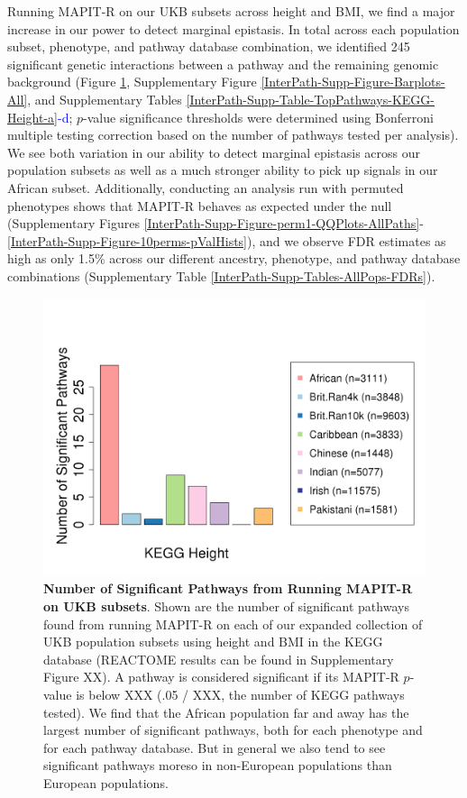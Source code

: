 \documentclass[12pt, a4paper]{article}
\begin{document}
Running MAPIT-R on our UKB subsets across height and BMI, we find a major increase in our power to detect marginal epistasis. In total across each population subset, phenotype, and pathway database combination, we identified 245 significant genetic interactions between a pathway and the remaining genomic background (Figure \ref{InterPath-Main-Figure-Barplots-KEGGHght}, Supplementary Figure \ref{InterPath-Supp-Figure-Barplots-All}, and Supplementary Tables \ref{InterPath-Supp-Table-TopPathways-KEGG-Height-a}\textcolor{blue}{-d}; $p$-value significance thresholds were determined using Bonferroni multiple testing correction based on the number of pathways tested per analysis). We see both variation in our ability to detect marginal epistasis across our population subsets as well as a much stronger ability to pick up signals in our African subset. Additionally, conducting an analysis run with permuted phenotypes shows that MAPIT-R behaves as expected under the null (Supplementary Figures \ref{InterPath-Supp-Figure-perm1-QQPlots-AllPaths}-\ref{InterPath-Supp-Figure-10perms-pValHists}), and we observe FDR estimates as high as only 1.5\% across our different ancestry, phenotype, and pathway database combinations (Supplementary Table \ref{InterPath-Supp-Tables-AllPops-FDRs}).

\begin{figure}[htbp]
\centering
\includegraphics[scale=.35]{Images/Main/InterPath_Main_Figure_Barplots_KEGGHght_vs1.png}
\caption[TBD]{\textbf{Number of Significant Pathways from Running MAPIT-R on UKB subsets}. Shown are the number of significant pathways found from running MAPIT-R on each of our expanded collection of UKB population subsets using height and BMI in the KEGG database (REACTOME results can be found in Supplementary Figure XX). A pathway is considered significant if its MAPIT-R $p$-value is below XXX (.05 / XXX, the number of KEGG pathways tested). We find that the African population far and away has the largest number of significant pathways, both for each phenotype and for each pathway database. But in general we also tend to see significant pathways moreso in non-European populations than European populations.}
\label{InterPath-Main-Figure-Barplots-KEGGHght}
\end{figure}
\end{document}
